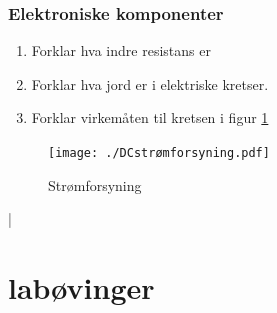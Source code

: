 \documentclass[12pt,a4paper]{article}
\begin{document}
\subsubsection{Elektroniske komponenter}
\begin{enumerate}
\item Forklar hva indre resistans er
\item Forklar hva jord er i elektriske kretser. 
\item Forklar virkemåten til kretsen i figur \ref{fig:Str=0000F8mforsyning} 
\end{enumerate}
\noindent \begin{center}
\begin{figure}
\noindent \begin{centering}
\texttt{[image: ./DCstrømforsyning.pdf]}
\par\end{centering}
\caption{\label{fig:Str=0000F8mforsyning}Strømforsyning}
\end{figure}
\par\end{center}
\newpage
|\newpage
\section{labøvinger}
\end{document}
